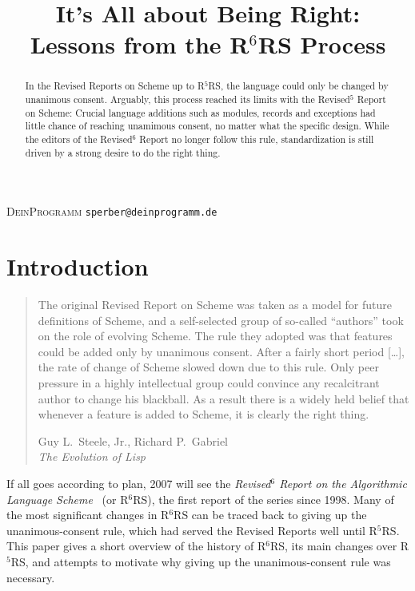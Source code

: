 \documentclass{sigplanconf}
\newcommand{\rn}[1]{R$^{#1}$RS}
\begin{document}

\title{It's All about Being Right:\\ Lessons from the R$^6$RS Process}

{\textsc{DeinProgramm}}
{\texttt{sperber@deinprogramm.de}}

\maketitle


\begin{abstract}
  In the Revised Reports on Scheme up to \rn{5}, the language could
  only be changed by unanimous consent. Arguably, this process reached
  its limits with the Revised$^5$ Report on Scheme: Crucial language
  additions such as modules, records and exceptions had little chance
  of reaching unamimous consent, no matter what the specific design.
  While the editors of the Revised$^6$ Report no longer follow this
  rule, standardization is still driven by a strong desire to do the
  right thing. 
\end{abstract}

\section{Introduction}
\label{sec:intro}

\begin{quote}
  The original Revised Report on Scheme was taken as a model for
  future definitions of Scheme, and a self-selected group of so-called
  ``authors'' took on the role of evolving Scheme. The rule they
  adopted was that features could be added only by unanimous consent.
  After a fairly short period [\ldots], the rate of change of Scheme
  slowed down due to this rule. Only peer pressure in a highly
  intellectual group could convince any recalcitrant author to change
  his blackball. As a result there is a widely held belief that
  whenever a feature is added to Scheme, it is clearly the right
  thing.

  \begin{flushright}
    Guy L.\ Steele, Jr., Richard P.\ Gabriel\\ \textit{The Evolution of
      Lisp}~\cite{SteeleGabriel1993}
  \end{flushright}
\end{quote}
%
If all goes according to plan, 2007 will see the \textit{Revised$^6$
  Report on the Algorithmic Language Scheme}~\cite{R6RS} (or \rn{6}), the first
report of the series since 1998.  Many of the most significant changes
in \rn{6} can be traced back to giving up the unanimous-consent rule,
which had served the Revised Reports well until \rn{5}.  This paper
gives a short overview of the history of \rn{6}, its main changes over
\rn{5}, and attempts to motivate why giving up the unanimous-consent
rule was necessary.
\end{document}
